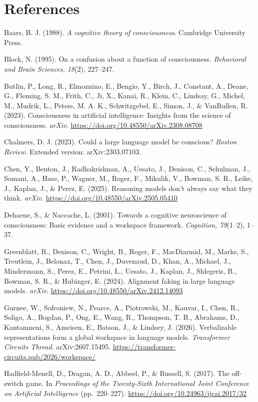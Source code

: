 \documentclass[
  11pt,
]{article}
\begin{document}
\section{References}\label{references}

Baars, B. J. (1988). \emph{A cognitive theory of consciousness}.
Cambridge University Press.

Block, N. (1995). On a confusion about a function of consciousness.
\emph{Behavioral and Brain Sciences, 18}(2), 227--247.

Butlin, P., Long, R., Elmoznino, E., Bengio, Y., Birch, J., Constant,
A., Deane, G., Fleming, S. M., Frith, C., Ji, X., Kanai, R., Klein, C.,
Lindsay, G., Michel, M., Mudrik, L., Peters, M. A. K., Schwitzgebel, E.,
Simon, J., \& VanRullen, R. (2023). Consciousness in artificial
intelligence: Insights from the science of consciousness. \emph{arXiv}.
\url{https://doi.org/10.48550/arXiv.2308.08708}

Chalmers, D. J. (2023). Could a large language model be conscious?
\emph{Boston Review}. Extended version: arXiv:2303.07103.

Chen, Y., Benton, J., Radhakrishnan, A., Uesato, J., Denison, C.,
Schulman, J., Somani, A., Hase, P., Wagner, M., Roger, F., Mikulik, V.,
Bowman, S. R., Leike, J., Kaplan, J., \& Perez, E. (2025). Reasoning
models don't always say what they think. \emph{arXiv}.
\url{https://doi.org/10.48550/arXiv.2505.05410}

Dehaene, S., \& Naccache, L. (2001). Towards a cognitive neuroscience of
consciousness: Basic evidence and a workspace framework.
\emph{Cognition, 79}(1--2), 1--37.

Greenblatt, R., Denison, C., Wright, B., Roger, F., MacDiarmid, M.,
Marks, S., Treutlein, J., Belonax, T., Chen, J., Duvenaud, D., Khan, A.,
Michael, J., Mindermann, S., Perez, E., Petrini, L., Uesato, J., Kaplan,
J., Shlegeris, B., Bowman, S. R., \& Hubinger, E. (2024). Alignment
faking in large language models. \emph{arXiv}.
\url{https://doi.org/10.48550/arXiv.2412.14093}

Gurnee, W., Sofroniew, N., Pearce, A., Piotrowski, M., Kauvar, I., Chen,
R., Soligo, A., Bogdan, P., Ong, E., Wang, R., Thompson, T. B.,
Abrahams, D., Kantamneni, S., Ameisen, E., Batson, J., \& Lindsey, J.
(2026). Verbalizable representations form a global workspace in language
models. \emph{Transformer Circuits Thread}. arXiv:2607.15495.
\url{https://transformer-circuits.pub/2026/workspace/}

Hadfield-Menell, D., Dragan, A. D., Abbeel, P., \& Russell, S. (2017).
The off-switch game. In \emph{Proceedings of the Twenty-Sixth
International Joint Conference on Artificial Intelligence}
(pp.~220--227). \url{https://doi.org/10.24963/ijcai.2017/32}
\end{document}
